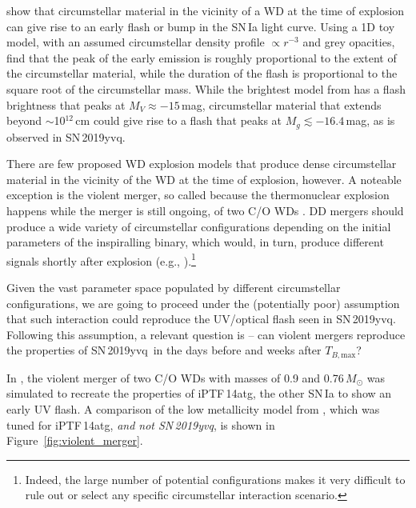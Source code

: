 \documentclass[twocolumn]{aastex63}
\newcommand{\tbmax}{$T_{B,\mathrm{max}}$}
\newcommand{\sn}{SN\,2019yvq}
\begin{document}
\citet{Piro16} show that circumstellar material in the vicinity of a WD at the
time of explosion can give rise to an early flash or bump in the SN\,Ia light
curve. Using a 1D toy model, with an assumed circumstellar density profile
$\propto r^{-3}$ and grey opacities, \citet{Piro16} find that the peak of the
early emission is roughly proportional to the extent of the circumstellar
material, while the duration of the flash is proportional to the square root
of the circumstellar mass. While the brightest model from \citet{Piro16} has a
flash brightness that peaks at $M_V \approx -15$\,mag, circumstellar material
that extends beyond $\sim$10$^{12}$\,cm could give rise to a flash that peaks
at $M_g \lesssim -16.4$\,mag, as is observed in \sn.

There are few proposed WD explosion models that produce dense circumstellar
material in the vicinity of the WD at the time of explosion, however. A
noteable exception is the violent merger, so called because the thermonuclear
explosion happens while the merger is still ongoing, of two C/O WDs
\citep{Pakmor10,Pakmor11,Pakmor12}. DD mergers should produce a wide variety
of circumstellar configurations depending on the initial parameters of the
inspiralling binary, which would, in turn, produce different signals shortly
after explosion (e.g., \citealt{Raskin13,Levanon19}).\footnote{Indeed, the
large number of potential configurations makes it very difficult to rule out
or select any specific circumstellar interaction scenario.}

Given the vast parameter space populated by different circumstellar
configurations, we are going to proceed under the (potentially poor)
assumption that such interaction could reproduce the UV/optical flash seen in
\sn. Following this assumption, a relevant question is -- can violent mergers
reproduce the properties of \sn\ in the days before and weeks after \tbmax?

In \citet{Kromer16}, the violent merger of two C/O WDs with masses of 0.9 and
0.76\,$M_\odot$ was simulated to recreate the properties of iPTF\,14atg, the
other SN\,Ia to show an early UV flash. A comparison of the low metallicity
model from \citet{Kromer16}, which was tuned for iPTF\,14atg, \textit{and not
\sn}, is shown in Figure~\ref{fig:violent_merger}.
\end{document}
